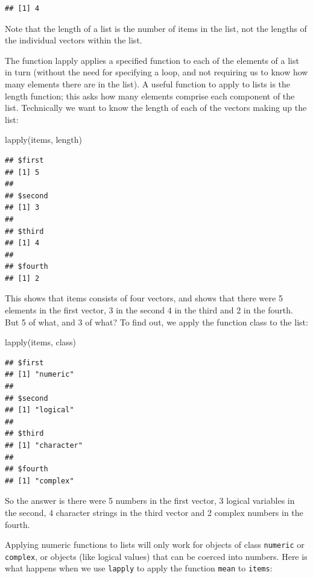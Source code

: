 \documentclass[
]{book}
\newenvironment{Shaded}{\begin{snugshade}}{\end{snugshade}}
\newcommand{\FunctionTok}[1]{\textcolor[rgb]{0.00,0.00,0.00}{#1}}
\newcommand{\NormalTok}[1]{#1}
\theoremstyle{definition}
\theoremstyle{definition}
\theoremstyle{definition}
\theoremstyle{definition}
\theoremstyle{remark}
\begin{document}
\begin{verbatim}
## [1] 4
\end{verbatim}

Note that the length of a list is the number of items in the list, not the lengths of the individual vectors within the list.

The function lapply applies a specified function to each of the elements of a list in turn (without the need for specifying a loop, and not requiring us to know how many elements there are in the list). A useful function to apply to lists is the length function; this asks how many elements comprise each component of the list. Technically we want to know the length of each of the vectors making up the list:

\begin{Shaded}
\begin{Highlighting}[]
\FunctionTok{lapply}\NormalTok{(items, length)}
\end{Highlighting}
\end{Shaded}

\begin{verbatim}
## $first
## [1] 5
## 
## $second
## [1] 3
## 
## $third
## [1] 4
## 
## $fourth
## [1] 2
\end{verbatim}

This shows that items consists of four vectors, and shows that there were 5 elements in the first vector, 3 in the second 4 in the third and 2 in the fourth. But 5 of what, and 3 of what? To find out, we apply the function class to the list:

\begin{Shaded}
\begin{Highlighting}[]
\FunctionTok{lapply}\NormalTok{(items, class)}
\end{Highlighting}
\end{Shaded}

\begin{verbatim}
## $first
## [1] "numeric"
## 
## $second
## [1] "logical"
## 
## $third
## [1] "character"
## 
## $fourth
## [1] "complex"
\end{verbatim}

So the answer is there were 5 numbers in the first vector, 3 logical variables in the second, 4 character strings in the third vector and 2 complex numbers in the fourth.

Applying numeric functions to lists will only work for objects of class \texttt{numeric} or \texttt{complex}, or objects (like logical values) that can be coerced into numbers. Here is what happens when we use \texttt{lapply} to apply the function \texttt{mean} to \texttt{items}:
\end{document}
